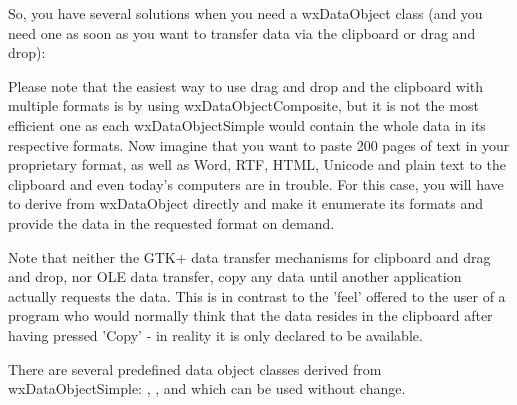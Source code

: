 So, you have several solutions when you need a wxDataObject class (and you need
one as soon as you want to transfer data via the clipboard or drag and drop):

\begin{twocollist}\itemsep=1cm
\end{twocollist}

Please note that the easiest way to use drag and drop and the clipboard with
multiple formats is by using wxDataObjectComposite, but it is not the most
efficient one as each wxDataObjectSimple would contain the whole data in its
respective formats. Now imagine that you want to paste 200 pages of text in
your proprietary format, as well as Word, RTF, HTML, Unicode and plain text to
the clipboard and even today's computers are in trouble. For this case, you
will have to derive from wxDataObject directly and make it enumerate its
formats and provide the data in the requested format on demand.

Note that neither the GTK+ data transfer mechanisms for clipboard and
drag and drop, nor OLE data transfer, copy any data until another application
actually requests the data. This is in contrast to the 'feel' offered to the
user of a program who would normally think that the data resides in the
clipboard after having pressed 'Copy' - in reality it is only declared to be
available.

There are several predefined data object classes derived from
wxDataObjectSimple: , 
,
 and
which can be used without change.

